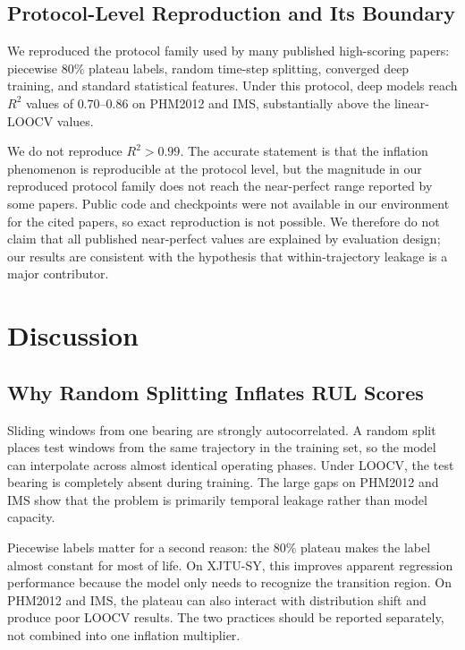 \documentclass[5p,twocolumn]{elsarticle}
\begin{document}
\subsection{Protocol-Level Reproduction and Its Boundary}
We reproduced the protocol family used by many published high-scoring papers: piecewise 80\% plateau labels, random time-step splitting, converged deep training, and standard statistical features. Under this protocol, deep models reach $R^2$ values of $0.70$--$0.86$ on PHM2012 and IMS, substantially above the linear-LOOCV values.

We do not reproduce $R^2>0.99$. The accurate statement is that the inflation phenomenon is reproducible at the protocol level, but the magnitude in our reproduced protocol family does not reach the near-perfect range reported by some papers. Public code and checkpoints were not available in our environment for the cited papers, so exact reproduction is not possible. We therefore do not claim that all published near-perfect values are explained by evaluation design; our results are consistent with the hypothesis that within-trajectory leakage is a major contributor.

\section{Discussion}
\subsection{Why Random Splitting Inflates RUL Scores}
Sliding windows from one bearing are strongly autocorrelated. A random split places test windows from the same trajectory in the training set, so the model can interpolate across almost identical operating phases. Under LOOCV, the test bearing is completely absent during training. The large gaps on PHM2012 and IMS show that the problem is primarily temporal leakage rather than model capacity.

Piecewise labels matter for a second reason: the 80\% plateau makes the label almost constant for most of life. On XJTU-SY, this improves apparent regression performance because the model only needs to recognize the transition region. On PHM2012 and IMS, the plateau can also interact with distribution shift and produce poor LOOCV results. The two practices should be reported separately, not combined into one inflation multiplier.
\end{document}
